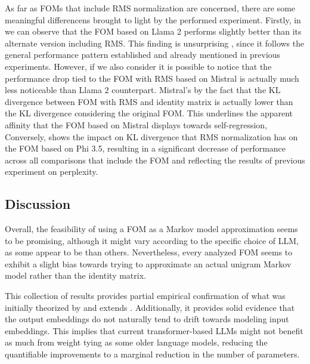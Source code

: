 As far as FOMs that include RMS normalization are concerned, there are some meaningful differencens brought to light by the performed experiment.
Firstly, in  we can observe that the FOM based on Llama 2 performs slightly better than its alternate version including RMS.
This finding is unsurprising , since it follows the general performance pattern established and already mentioned in previous experiments.
However, if we also consider  it is possible to notice that the performance drop tied to the FOM with RMS based on Mistral is actually much less noticeable than  Llama 2 counterpart.
Mistral's  by the fact that the KL divergence between FOM with RMS and identity matrix is actually lower than the KL divergence considering the original FOM.
This underlines the apparent affinity that the FOM based on Mistral displays towards self-regression,
Conversely,  shows the  impact on KL divergence that RMS normalization has on the FOM based  on Phi 3.5, resulting in a significant decrease of performance across all comparisons that include the FOM and reflecting the results of  previous experiment on perplexity.

\subsection{Discussion}

Overall, the feasibility of using a FOM as a Markov model approximation seems to be promising, although it might vary according to the specific choice of LLM, as some appear to be  than others.
Nevertheless, every analyzed FOM seems to exhibit a slight bias towards trying to approximate an actual unigram Markov model rather than the identity matrix.

This collection of results provides partial empirical confirmation of what was initially theorized by  and extends .
Additionally, it provides solid evidence that the output embeddings do not naturally tend to drift towards modeling input embeddings.
This implies that current transformer-based LLMs might not benefit as much from weight tying as some older language models, reducing the quantifiable improvements to a marginal reduction in the number of parameters.

